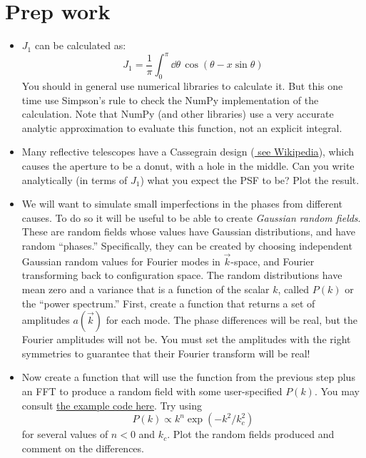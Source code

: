 \documentclass[11pt, preprint]{aastex}
\begin{document}
\section{Prep work}

\begin{itemize}
\item $J_1$ can be calculated as:
  \begin{equation}
   J_1 = \frac{1}{\pi} \int_0^\pi \dd\theta\, \cos\left(\theta -
   x\sin\theta\right)
  \end{equation}
  You should in general use numerical libraries to calculate it.  But
  this one time use Simpson's rule to check the NumPy implementation
  of the calculation. Note that NumPy (and other libraries) use a very
  accurate analytic approximation to evaluate this function, not an
  explicit integral.
\item Many reflective telescopes have a Cassegrain design
  (\href{https://en.wikipedia.org/wiki/Cassegrain_reflector}{\color{blue}
  see Wikipedia}), which causes the aperture to be a donut, with a
  hole in the middle. Can you write analytically (in terms of $J_1$)
  what you expect the PSF to be? Plot the result.
\item We will want to simulate small imperfections in the phases from
  different causes. To do so it will be useful to be able to create
  {\it Gaussian random fields}. These are random fields whose values
  have Gaussian distributions, and have random ``phases.''
  Specifically, they can be created by choosing independent Gaussian
  random values for Fourier modes in $\vec{k}$-space, and Fourier
  transforming back to configuration space. The random distributions
  have mean zero and a variance that is a function of the scalar $k$,
  called $P(k)$ or the ``power spectrum.'' First, create a function
  that returns a set of amplitudes $a(\vec{k})$ for each mode. The
  phase differences will be real, but the Fourier amplitudes will not
  be. You must set the amplitudes with the right symmetries to
  guarantee that their Fourier transform will be real!
\item Now create a function that will use the function from the
  previous step plus an FFT to produce a random
  field with some user-specified $P(k)$. You may consult
  \href{http://andrewwalker.github.io/statefultransitions/post/gaussian-fields/}{\color{blue}
    the example code here}. Try using
  \begin{equation}
    P(k) \propto k^{n} \exp\left(- k^2 / k_c^2\right)
  \end{equation}
    for several values of $n<0$ and $k_c$. Plot the random fields
    produced and comment on the differences.
\end{itemize}
\end{document}
